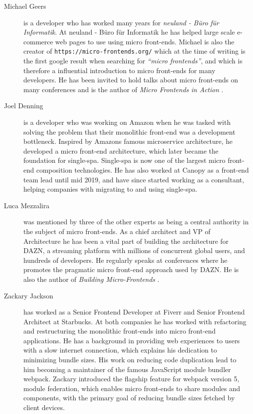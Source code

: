 \begin{description}
    \item[Michael Geers] is a developer who has worked many years for \textit{neuland - Büro für Informatik}. At neuland - Büro für Informatik he has helped large scale e-commerce web pages to use using micro front-ends. Michael is also the creator of \texttt{https://micro-frontends.org/} which at the time of writing is the first google result when searching for \textit{``micro frontends''}, and which is therefore a influential introduction to micro front-ends for many developers. He has been invited to hold talks about micro front-ends on many conferences and is the author of \textit{Micro Frontends in Action} \cite{Geers2020}.
    
    \item[Joel Denning] is a developer who was working on Amazon when he was tasked with solving the problem that their monolithic front-end was a development bottleneck. Inspired by Amazons famous microservice architecture, he developed a micro front-end architecture, which later became the foundation for single-spa. Single-spa is now one of the largest micro front-end composition technologies. He has also worked at Canopy as a front-end team lead until mid 2019, and have since started working as a consultant, helping companies with migrating to and using single-spa.
    
    \item[Luca Mezzalira] was mentioned by three of the other experts as being a central authority in the subject of micro front-ends. As a chief architect and VP of Architecture he has been a vital part of building the architecture for DAZN, a streaming platform with millions of concurrent global users, and hundreds of developers. He regularly speaks at conferences where he promotes the pragmatic micro front-end approach used by DAZN. He is also the author of \textit{Building Micro-Frontends} \cite{Mezzalira2021a}.
    
    \item[Zackary Jackson] has worked as a Senior Frontend Developer at Fiverr and Senior Frontend Architect at Starbucks. At both companies he has worked with refactoring and restructuring the monolithic front-ends into micro front-end applications. He has a background in providing web experiences to users with a slow internet connection, which explains his dedication to minimizing bundle sizes. His work on reducing code duplication lead to him becoming a maintainer of the famous JavaScript module bundler webpack. Zackary introduced the flagship feature for webpack version 5, module federation, which enables micro front-ends to share modules and components, with the primary goal of reducing bundle sizes fetched by client devices.
    

\end{description}
